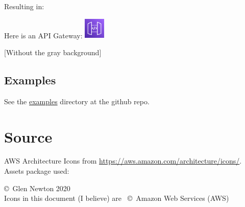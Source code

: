 \documentclass[12pt]{article}
\begin{document}
\noindent Resulting in:\\
\begin{blockquote}
Here is an API Gateway:
\includegraphics[width=1cm]{../icons_tex/Arch_Amazon-API-Gateway_64.pdf}
\end{blockquote}
    [Without the gray background]
    
\subsection{Examples}
See the \href{https://github.com/gnewton/awsArchIcons2LaTeX/examples}{examples} directory at the github repo.
  
\section{Source}
AWS Architecture Icons from \url{https://aws.amazon.com/architecture/icons/}.\\
Assets package used: \href{https://d1.awsstatic.com/webteam/architecture-icons/Q32020/AWS-Architecture-Assets-For-Light-and-Dark-BG_20200911.478ff05b80f909792f7853b1a28de8e28eac67f4.zip}{}

\vspace{3cm}
\noindent \copyright\ Glen Newton 2020\\
Icons in this document (I believe) are \ \copyright\ Amazon Web Services (AWS)
\vspace{5mm}


\setlength{\parindent}{0pt}




\normalsize

\printindex
\end{document}
